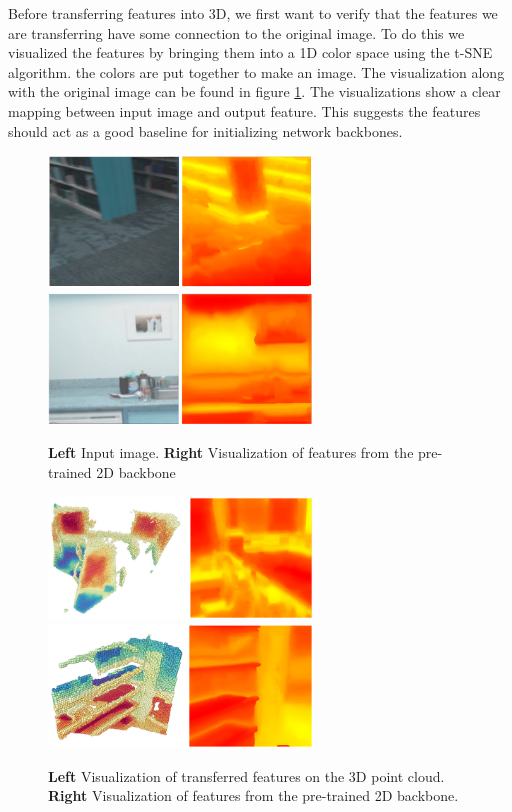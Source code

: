 \documentclass[10pt,twocolumn,letterpaper]{article}
\begin{document}
Before transferring features into 3D, we first want to verify that the features we are transferring have some connection to the original image. To do this we visualized the features by bringing them into a 1D color space using the t-SNE \cite{maaten2008Visualizing} algorithm. the colors are put together to make an image. The visualization along with the original image can be found in figure \ref{fig:features2dvis}. The visualizations show a clear mapping between input image and output feature. This suggests the features should act as a good baseline for initializing network backbones.

\begin{figure}
    \centering
    \includegraphics[width=7cm]{images/experiments/25.02.2022-image-pretrain-vis2.png}
    \includegraphics[width=7cm]{images/experiments/25.02.2022-image-pretrain-vis1.png}
    \caption{\textbf{Left} Input image. \textbf{Right} Visualization of features from the pre-trained 2D backbone}
    \label{fig:features2dvis}
\end{figure}

\begin{figure}
    \centering
    \includegraphics[width=7cm]{images/experiments/image-to-point-vis1.png}
    \includegraphics[width=7cm]{images/experiments/image-to-point-vis2.png}
    \caption{\textbf{Left} Visualization of transferred features on the 3D point cloud. \textbf{Right}  Visualization of features from the pre-trained 2D backbone.}
    \label{fig:features2d-3dvis}
\end{figure}
\end{document}
